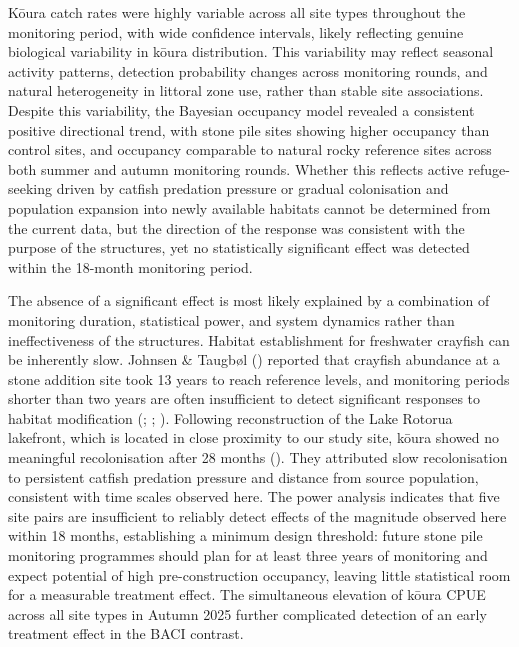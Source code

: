 \documentclass[
  letterpaper,
  DIV=11,
  numbers=noendperiod]{scrartcl}
\begin{document}
Kōura catch rates were highly variable across all site types throughout
the monitoring period, with wide confidence intervals, likely reflecting
genuine biological variability in kōura distribution. This variability
may reflect seasonal activity patterns, detection probability changes
across monitoring rounds, and natural heterogeneity in littoral zone
use, rather than stable site associations. Despite this variability, the
Bayesian occupancy model revealed a consistent positive directional
trend, with stone pile sites showing higher occupancy than control
sites, and occupancy comparable to natural rocky reference sites across
both summer and autumn monitoring rounds. Whether this reflects active
refuge-seeking driven by catfish predation pressure or gradual
colonisation and population expansion into newly available habitats
cannot be determined from the current data, but the direction of the
response was consistent with the purpose of the structures, yet no
statistically significant effect was detected within the 18-month
monitoring period.

The absence of a significant effect is most likely explained by a
combination of monitoring duration, statistical power, and system
dynamics rather than ineffectiveness of the structures. Habitat
establishment for freshwater crayfish can be inherently slow. Johnsen \&
Taugbøl () reported that crayfish
abundance at a stone addition site took 13 years to reach reference
levels, and monitoring periods shorter than two years are often
insufficient to detect significant responses to habitat modification
(;
;
). Following reconstruction
of the Lake Rotorua lakefront, which is located in close proximity to
our study site, kōura showed no meaningful recolonisation after 28
months (). They attributed slow
recolonisation to persistent catfish predation pressure and distance
from source population, consistent with time scales observed here. The
power analysis indicates that five site pairs are insufficient to
reliably detect effects of the magnitude observed here within 18 months,
establishing a minimum design threshold: future stone pile monitoring
programmes should plan for at least three years of monitoring and expect
potential of high pre-construction occupancy, leaving little statistical
room for a measurable treatment effect. The simultaneous elevation of
kōura CPUE across all site types in Autumn 2025 further complicated
detection of an early treatment effect in the BACI contrast.
\end{document}
